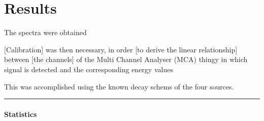 \section{Results}
The spectra were obtained

[Calibration] was then necessary,
in order [to derive the linear relationship] between [the channels] of the Multi Channel Analyser (MCA) thingy in which signal is detected 
and the corresponding energy values

This was accomplished using the known decay schems of the four sources.

\rule{\textwidth}{1pt}
\prntlen{\textwidth}
\paragraph{Statistics}

